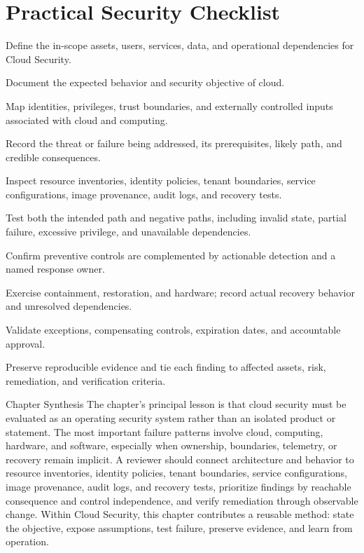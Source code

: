\documentclass[11pt,letterpaper]{article}
\begin{document}
\section*{Practical Security Checklist}
\begin{CornellChecklist}
\item Define the in-scope assets, users, services, data, and operational dependencies for Cloud Security.
\item Document the expected behavior and security objective of cloud.
\item Map identities, privileges, trust boundaries, and externally controlled inputs associated with cloud and computing.
\item Record the threat or failure being addressed, its prerequisites, likely path, and credible consequences.
\item Inspect resource inventories, identity policies, tenant boundaries, service configurations, image provenance, audit logs, and recovery tests.
\item Test both the intended path and negative paths, including invalid state, partial failure, excessive privilege, and unavailable dependencies.
\item Confirm preventive controls are complemented by actionable detection and a named response owner.
\item Exercise containment, restoration, and hardware; record actual recovery behavior and unresolved dependencies.
\item Validate exceptions, compensating controls, expiration dates, and accountable approval.
\item Preserve reproducible evidence and tie each finding to affected assets, risk, remediation, and verification criteria.
\end{CornellChecklist}
\begin{CornellSummaryBox}{Chapter Synthesis}
The chapter's principal lesson is that cloud security must be evaluated as an operating security system rather than an isolated product or statement. The most important failure patterns involve cloud, computing, hardware, and software, especially when ownership, boundaries, telemetry, or recovery remain implicit. A reviewer should connect architecture and behavior to resource inventories, identity policies, tenant boundaries, service configurations, image provenance, audit logs, and recovery tests, prioritize findings by reachable consequence and control independence, and verify remediation through observable change. Within Cloud Security, this chapter contributes a reusable method: state the objective, expose assumptions, test failure, preserve evidence, and learn from operation.
\end{CornellSummaryBox}
\end{document}
